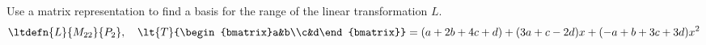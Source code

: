 Use a matrix representation to find a basis for the range of the linear transformation $L$.
%
\begin{equation*}
\ltdefn{L}{M_{22}}{P_2},\quad
\lt{T}{\begin{bmatrix}a&b\\c&d\end{bmatrix}}=
(a+2b+4c+d)+(3a+c-2d)x+(-a+b+3c+3d)x^2
\end{equation*}